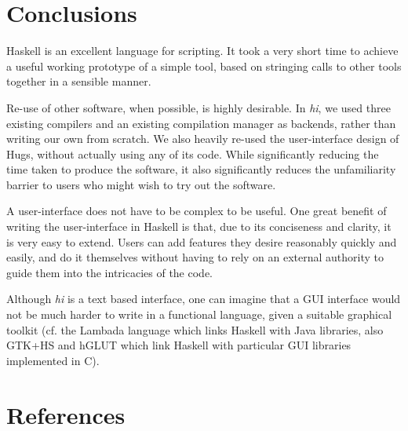 \documentclass[a4paper]{llncs}
\begin{document}
\section{Conclusions}

Haskell is an excellent language for scripting.  It took a very
short time to achieve a useful working prototype of a simple tool,
based on stringing calls to other tools together in a sensible manner.

Re-use of other software, when possible, is highly desirable.  In {\em
hi}, we used three existing compilers and an existing compilation
manager as backends, rather than writing our own from scratch.
We also heavily re-used the user-interface design of Hugs, without
actually using any of its code.  While significantly reducing the
time taken to produce the software, it also significantly reduces
the unfamiliarity barrier to users who might wish to try out the
software.

A user-interface does not have to be complex to be useful.  One great
benefit of writing the user-interface in Haskell is that, due to
its conciseness and clarity, it is very easy to extend.  Users can
add features they desire reasonably quickly and easily, and do it
themselves without having to rely on an external authority to guide
them into the intricacies of the code.

Although {\em hi} is a text based interface, one can imagine that a GUI
interface would not be much harder to write in a functional language,
given a suitable graphical toolkit (cf. the Lambada language which
links Haskell with Java libraries, also GTK+HS and hGLUT which link
Haskell with particular GUI libraries implemented in C).

\section*{References}
\end{document}
